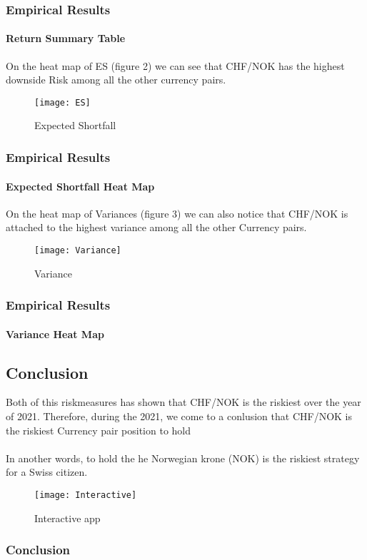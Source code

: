 \documentclass[10pt]{beamer}
\begin{document}
\begin{frame}
\frametitle{Empirical Results}
\framesubtitle{Return Summary Table}

On the heat map of ES (figure 2) we can see that CHF/NOK has the highest downside Risk among all the other currency pairs.

\begin{figure}[H]
\centering
\texttt{[image: ES]}
\caption{Expected Shortfall}\label{visina8}
\end{figure}

\frametitle{Empirical Results}
\framesubtitle{Expected Shortfall Heat Map}
\end{frame}
\begin{frame}

On the heat map of Variances (figure 3) we can also notice that CHF/NOK is attached to the highest variance among all the other Currency pairs.

\begin{figure}[H]
\centering
\texttt{[image: Variance]}
\caption{Variance}\label{visina8}
\end{figure}

\frametitle{Empirical Results}
\framesubtitle{Variance Heat Map}
\end{frame}

\begin{frame}
\section{Conclusion}

Both of this riskmeasures has shown that CHF/NOK is the riskiest over the year of 2021. Therefore, during the 2021, we come to a conlusion that CHF/NOK is the riskiest Currency pair position to hold
\\ \hspace*{\fill} \\
In another words, to hold the he Norwegian krone (NOK) is the riskiest strategy for a Swiss citizen.

\begin{figure}[H]
\centering
\texttt{[image: Interactive]}
\caption{Interactive app}\label{visina8}
\end{figure}

\frametitle{Conclusion}

\end{frame}
\end{document}
